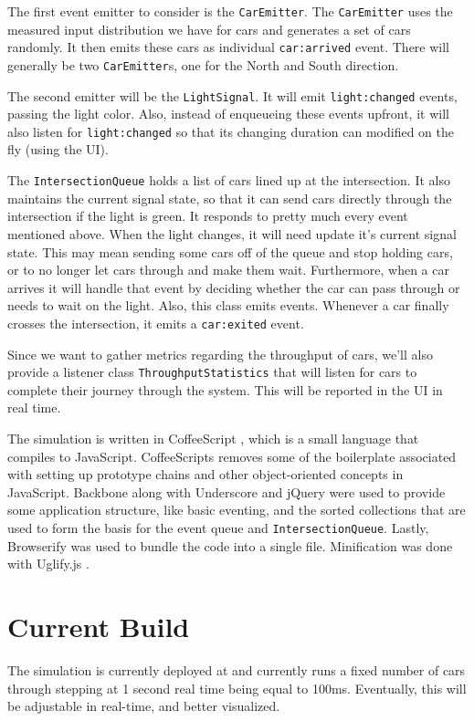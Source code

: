 \documentclass[a4paper,12pt]{article}
\begin{document}
The first event emitter to consider is the \texttt{CarEmitter}. The \texttt{CarEmitter} uses the measured input
distribution we have for cars and generates a set of cars randomly. It then emits these cars as individual
\texttt{car:arrived} event. There will generally be two \texttt{CarEmitter}s, one for the North and South direction.

The second emitter will be the \texttt{LightSignal}. It will emit \texttt{light:changed} events, passing the light color.
Also, instead of enqueueing these events upfront, it will also listen for \texttt{light:changed} so that its
changing duration can modified on the fly (using the UI).

The \texttt{IntersectionQueue} holds a list of cars lined up at the intersection. It also maintains the
current signal state, so that it can send cars directly through the intersection if the light is green. It responds
to pretty much every event mentioned above. When the light changes, it will need update it's current signal state.
This may mean sending some cars off of the queue and stop holding cars, or to no longer let cars through and make them
wait. Furthermore, when a car arrives it will handle that event by deciding whether the car can pass through or needs
to wait on the light. Also, this class emits events. Whenever a car finally crosses the intersection, it emits
a \texttt{car:exited} event.

Since we want to gather metrics regarding the throughput of cars, we'll also provide a listener class
\texttt{ThroughputStatistics} that will listen for cars to complete their journey through the system. This will
be reported in the UI in real time.

The simulation is written in CoffeeScript \cite{coffeescript}, which is a small language that compiles to JavaScript.
CoffeeScripts removes some of the boilerplate associated with setting up prototype chains and other object-oriented
concepts in JavaScript.
Backbone \cite{backbone} along with Underscore \cite{underscore} and jQuery \cite{jquery} were used to provide some
application structure, like basic eventing, and the sorted
collections that are used to form the basis for the event queue and \texttt{IntersectionQueue}. Lastly, Browserify
\cite{browserify} was used to bundle the code into a single file. Minification was done with Uglify.js \cite{uglify}.

\section{Current Build}
The simulation is currently deployed at \cite{aprilandchip} and currently runs a fixed number of cars through stepping
at 1 second real time being equal to 100ms. Eventually, this will be adjustable in real-time, and better visualized.
\end{document}
